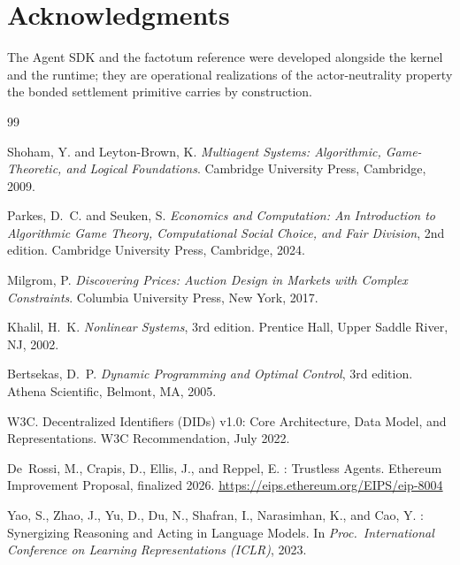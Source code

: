 \documentclass[11pt,a4paper]{article}
\theoremstyle{definition}
\theoremstyle{remark}
\begin{document}
\section*{Acknowledgments}
The Agent SDK and the factotum reference were developed alongside
the kernel and the runtime; they are operational realizations of the
actor-neutrality property the bonded settlement primitive carries
by construction.

\begin{thebibliography}{99}

Shoham, Y. and Leyton-Brown, K.
\newblock \emph{Multiagent Systems: Algorithmic, Game-Theoretic, and
  Logical Foundations}.
\newblock Cambridge University Press, Cambridge, 2009.

Parkes, D.~C. and Seuken, S.
\newblock \emph{Economics and Computation: An Introduction to
  Algorithmic Game Theory, Computational Social Choice, and Fair
  Division}, 2nd edition.
\newblock Cambridge University Press, Cambridge, 2024.

Milgrom, P.
\newblock \emph{Discovering Prices: Auction Design in Markets with
  Complex Constraints}.
\newblock Columbia University Press, New York, 2017.

Khalil, H.~K.
\newblock \emph{Nonlinear Systems}, 3rd edition.
\newblock Prentice Hall, Upper Saddle River, NJ, 2002.

Bertsekas, D.~P.
\newblock \emph{Dynamic Programming and Optimal Control}, 3rd edition.
\newblock Athena Scientific, Belmont, MA, 2005.

W3C.
\newblock Decentralized Identifiers (DIDs) v1.0: Core Architecture,
  Data Model, and Representations.
\newblock W3C Recommendation, July 2022.

De~Rossi, M., Crapis, D., Ellis, J., and Reppel, E.
: Trustless Agents.
\newblock Ethereum Improvement Proposal, finalized 2026.
\newblock \url{https://eips.ethereum.org/EIPS/eip-8004}

Yao, S., Zhao, J., Yu, D., Du, N., Shafran, I., Narasimhan, K.,
  and Cao, Y.
: Synergizing Reasoning and Acting in Language
  Models.
\newblock In \emph{Proc.\ International Conference on Learning
  Representations (ICLR)}, 2023.


\end{thebibliography}
\end{document}
